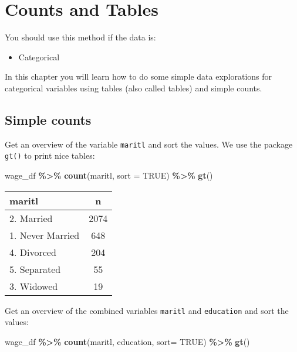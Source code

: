 \documentclass[
]{book}
\newenvironment{Shaded}{\begin{snugshade}}{\end{snugshade}}
\newcommand{\DataTypeTok}[1]{\textcolor[rgb]{0.13,0.29,0.53}{#1}}
\newcommand{\KeywordTok}[1]{\textcolor[rgb]{0.13,0.29,0.53}{\textbf{#1}}}
\newcommand{\NormalTok}[1]{#1}
\newcommand{\OperatorTok}[1]{\textcolor[rgb]{0.81,0.36,0.00}{\textbf{#1}}}
\newcommand{\OtherTok}[1]{\textcolor[rgb]{0.56,0.35,0.01}{#1}}
\newcommand{\StringTok}[1]{\textcolor[rgb]{0.31,0.60,0.02}{#1}}
\providecommand{\tightlist}{%
  \setlength{\itemsep}{0pt}\setlength{\parskip}{0pt}}
\begin{document}
\hypertarget{tables}{%
\chapter{Counts and Tables}\label{tables}}

You should use this method if the data is:

\begin{itemize}
\tightlist
\item
  Categorical
\end{itemize}

In this chapter you will learn how to do some simple data explorations for categorical variables using tables (also called tables) and simple counts.

\hypertarget{simple-counts}{%
\section{Simple counts}\label{simple-counts}}

Get an overview of the variable \texttt{maritl} and sort the values. We use the package \texttt{gt()} to print nice tables:

\begin{Shaded}
\begin{Highlighting}[]
\NormalTok{wage\_df }\OperatorTok{\%\textgreater{}\%}\StringTok{ }
\StringTok{  }\KeywordTok{count}\NormalTok{(maritl,}
        \DataTypeTok{sort =} \OtherTok{TRUE}\NormalTok{) }\OperatorTok{\%\textgreater{}\%}\StringTok{ }
\StringTok{  }\KeywordTok{gt}\NormalTok{()}
\end{Highlighting}
\end{Shaded}

\captionsetup[table]{labelformat=empty,skip=1pt}
\begin{longtable}{lc}
\toprule
maritl & n \\ 
\midrule
2. Married & 2074 \\ 
1. Never Married & 648 \\ 
4. Divorced & 204 \\ 
5. Separated & 55 \\ 
3. Widowed & 19 \\ 
\bottomrule
\end{longtable}

Get an overview of the combined variables \texttt{maritl} and \texttt{education} and sort the values:

\begin{Shaded}
\begin{Highlighting}[]
\NormalTok{wage\_df }\OperatorTok{\%\textgreater{}\%}\StringTok{ }
\StringTok{  }\KeywordTok{count}\NormalTok{(maritl, education,}
        \DataTypeTok{sort=} \OtherTok{TRUE}\NormalTok{) }\OperatorTok{\%\textgreater{}\%}\StringTok{ }
\StringTok{  }\KeywordTok{gt}\NormalTok{()}
\end{Highlighting}
\end{Shaded}
\end{document}
